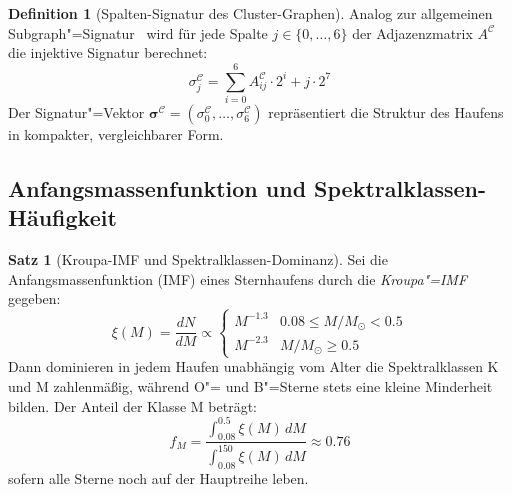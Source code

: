 ﻿\documentclass[a4paper,12pt]{article}
\theoremstyle{definition}
\newtheorem{definition}{Definition}
\newtheorem{satz}{Satz}
\begin{document}
\begin{definition}[Spalten-Signatur des Cluster-Graphen]
\label{def:clustersig}
    Analog zur allgemeinen Subgraph"=Signatur~\cite{subgraph2026}
    wird für jede Spalte $j \in \{0,\ldots,6\}$ der Adjazenzmatrix
    $A^{\mathcal{C}}$ die injektive Signatur berechnet:
    \[
        \sigma_j^{\mathcal{C}} = \sum_{i=0}^{6} A^{\mathcal{C}}_{ij} \cdot 2^i
        + j \cdot 2^7
    \]
    Der Signatur"=Vektor $\boldsymbol{\sigma}^{\mathcal{C}} =
    (\sigma_0^{\mathcal{C}}, \ldots, \sigma_6^{\mathcal{C}})$
    repräsentiert die Struktur des Haufens in kompakter, vergleichbarer Form.
\end{definition}

\subsection{Anfangsmassenfunktion und Spektralklassen-Häufigkeit}

\begin{satz}[Kroupa-IMF und Spektralklassen-Dominanz]
\label{satz:imf}
    Sei die Anfangsmassenfunktion (IMF) eines Sternhaufens durch die
    \emph{Kroupa"=IMF}~\cite{kroupa2001} gegeben:
    \[
        \xi(M) = \frac{dN}{dM} \propto \begin{cases}
            M^{-1.3} & 0.08 \leq M/M_\odot < 0.5 \\
            M^{-2.3} & M/M_\odot \geq 0.5
        \end{cases}
    \]
    Dann dominieren in jedem Haufen unabhängig vom Alter die Spektralklassen
    K und M zahlenmäßig, während O"= und B"=Sterne stets eine kleine Minderheit
    bilden. Der Anteil der Klasse M beträgt:
    \[
        f_M = \frac{\int_{0.08}^{0.5} \xi(M)\,dM}{\int_{0.08}^{150} \xi(M)\,dM}
        \approx 0.76
    \]
    sofern alle Sterne noch auf der Hauptreihe leben.
\end{satz}
\end{document}
